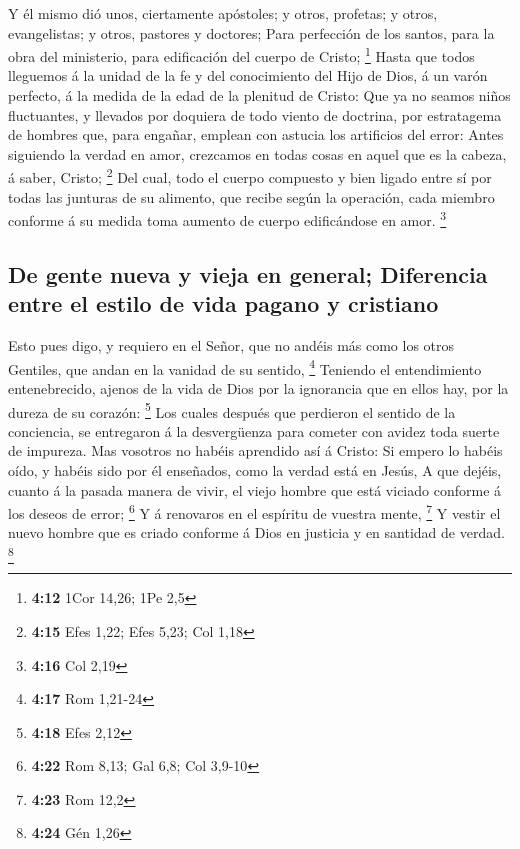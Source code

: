  Y él mismo dió unos, ciertamente apóstoles; y otros,
profetas; y otros, evangelistas; y otros, pastores y doctores;
 Para perfección de los santos, para la obra del
ministerio, para edificación del cuerpo de Cristo; \footnote{\textbf{4:12}
  1Cor 14,26; 1Pe 2,5}  Hasta que todos lleguemos á la
unidad de la fe y del conocimiento del Hijo de Dios, á un varón
perfecto, á la medida de la edad de la plenitud de Cristo: 
Que ya no seamos niños fluctuantes, y llevados por doquiera de todo
viento de doctrina, por estratagema de hombres que, para engañar,
emplean con astucia los artificios del error:  Antes
siguiendo la verdad en amor, crezcamos en todas cosas en aquel que es la
cabeza, á saber, Cristo; \footnote{\textbf{4:15} Efes 1,22; Efes 5,23;
  Col 1,18}  Del cual, todo el cuerpo compuesto y bien
ligado entre sí por todas las junturas de su alimento, que recibe según
la operación, cada miembro conforme á su medida toma aumento de cuerpo
edificándose en amor. \footnote{\textbf{4:16} Col 2,19}

\hypertarget{de-gente-nueva-y-vieja-en-general-diferencia-entre-el-estilo-de-vida-pagano-y-cristiano}{%
\subsection{De gente nueva y vieja en general; Diferencia entre el
estilo de vida pagano y
cristiano}\label{de-gente-nueva-y-vieja-en-general-diferencia-entre-el-estilo-de-vida-pagano-y-cristiano}}

 Esto pues digo, y requiero en el Señor, que no andéis más
como los otros Gentiles, que andan en la vanidad de su sentido,
\footnote{\textbf{4:17} Rom 1,21-24}  Teniendo el
entendimiento entenebrecido, ajenos de la vida de Dios por la ignorancia
que en ellos hay, por la dureza de su corazón: \footnote{\textbf{4:18}
  Efes 2,12}  Los cuales después que perdieron el sentido
de la conciencia, se entregaron á la desvergüenza para cometer con
avidez toda suerte de impureza.  Mas vosotros no habéis
aprendido así á Cristo:  Si empero lo habéis oído, y habéis
sido por él enseñados, como la verdad está en Jesús,  A que
dejéis, cuanto á la pasada manera de vivir, el viejo hombre que está
viciado conforme á los deseos de error; \footnote{\textbf{4:22} Rom
  8,13; Gal 6,8; Col 3,9-10}  Y á renovaros en el espíritu
de vuestra mente, \footnote{\textbf{4:23} Rom 12,2}  Y
vestir el nuevo hombre que es criado conforme á Dios en justicia y en
santidad de verdad. \footnote{\textbf{4:24} Gén 1,26}

